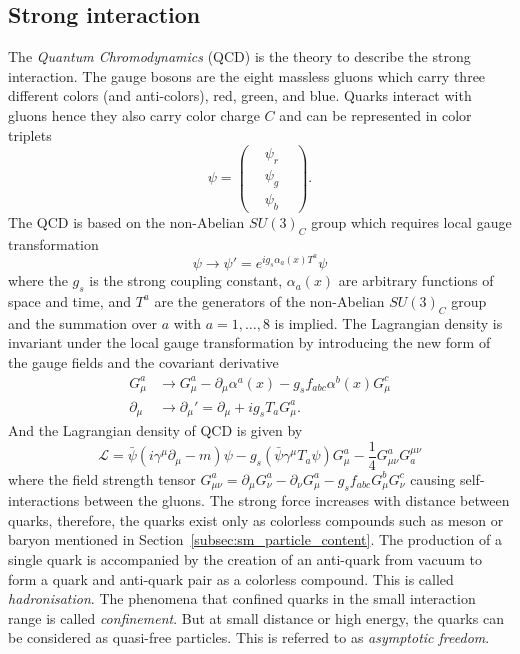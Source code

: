 \subsection{Strong interaction}
\label{subsec:sm_strong_interaction}
The \textit{Quantum Chromodynamics} (QCD) is the theory to describe the strong interaction.
The gauge bosons are the eight massless gluons which carry three different colors (and anti-colors), red, green, and blue.
Quarks interact with gluons hence they also carry color charge $C$ and can be represented in color triplets
\begin{equation}
\psi = 
\left(
\begin{matrix}
& \psi_{r} & \\
& \psi_{g} & \\
& \psi_{b} &
\end{matrix}
\right).
\label{eq:sm_quark_triplets}
\end{equation}
The QCD is based on the non-Abelian $SU(3)_{C}$ group which requires local gauge transformation
\begin{equation}
\psi \rightarrow \psi' = e^{i g_{s} \alpha_{a}(x) T^{a}}\psi
\label{eq:sm_qcd_gauge_transformation_1}
\end{equation}
where the $g_{s}$ is the strong coupling constant, $\alpha_{a}(x)$ are arbitrary functions of space and time, and $T^{a}$ are the generators of the non-Abelian $SU(3)_{C}$ group and the summation over $a$ with $a = 1, \dots, 8$ is implied.
The Lagrangian density is invariant under the local gauge transformation by introducing the new form of the gauge fields and the covariant derivative
\begin{align}
G_{\mu}^{a} & \rightarrow G_{\mu}^{a} -  \partial_{\mu} \alpha^{a}(x) - g_{s} f_{abc} \alpha^{b}(x) G_{\mu}^{c} \\
\partial_{\mu} & \rightarrow \partial_{\mu}' = \partial_{\mu} + i g_{s} T_{a} G_{\mu}^{a}.
\label{eq:sm_qcd_gauge_transformation_2}
\end{align}
And the Lagrangian density of QCD is given by
\begin{equation}
\mathcal{L} = \bar{\psi}(i \gamma^{\mu} \partial_{\mu} - m) \psi - g_{s} ( \bar{\psi} \gamma^{\mu} T_{a} \psi) G_{\mu}^{a} - \frac{1}{4} G_{\mu\nu}^{a} G_{a}^{\mu\nu}
\label{eq:sm_qcd_lagrangian}
\end{equation}
where the field strength tensor $G_{\mu\nu}^{a} = \partial_{\mu} G_{\nu}^{a} - \partial_{\nu} G_{\mu}^{a} - g_{s} f_{abc} G_{\mu}^{b} G_{\nu}^{c}$ causing self-interactions between the gluons.
The strong force increases with distance between quarks, therefore, the quarks exist only as colorless compounds such as meson or baryon mentioned in Section~\ref{subsec:sm_particle_content}.
The production of a single quark is accompanied by the creation of an anti-quark from vacuum to form a quark and anti-quark pair as a colorless compound.
This is called \textit{hadronisation}.
The phenomena that confined quarks in the small interaction range is called \textit{confinement}.
But at small distance or high energy, the quarks can be considered as quasi-free particles.
This is referred to as \textit{asymptotic freedom}.

